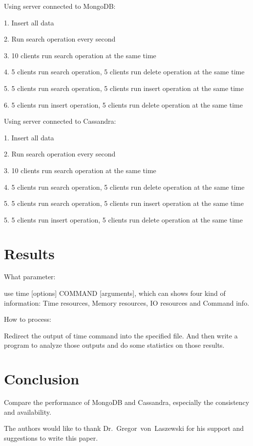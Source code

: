 Using server connected to MongoDB:

1. Insert all data

2. Run search operation every second

3. 10 clients run search operation at the same time

4. 5 clients run search operation, 5 clients run delete operation at the same time

5. 5 clients run search operation, 5 clients run insert operation at the same time

6. 5 clients run insert operation, 5 clients run delete operation at the same time


Using server connected to Cassandra:

1. Insert all data

2. Run search operation every second

3. 10 clients run search operation at the same time

4. 5 clients run search operation, 5 clients run delete operation at the same time

5. 5 clients run search operation, 5 clients run insert operation at the same time

5. 5 clients run insert operation, 5 clients run delete operation at the same time


\section{Results}
What parameter:

use time [options] COMMAND [arguments], which can shows four kind of information: Time resources, Memory resources, IO resources and Command info.

How to process:

Redirect the output of time command into the specified file. And then write a program to analyze those outputs and do some statistics on those results. 


\section{Conclusion}
Compare the performance of MongoDB and Cassandra, especially the consistency and availability.

\begin{acks}

  The authors would like to thank Dr.~Gregor~von~Laszewski for his
  support and suggestions to write this paper.

\end{acks}


 

